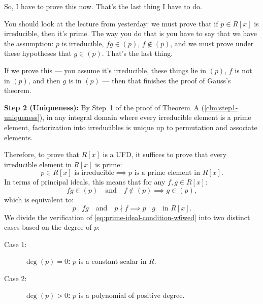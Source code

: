 \begin{proofWrapper}
\begin{speech}[00:31:28 - 00:33:17]
So, I have to prove this now. That's the last thing I have to do.

You should look at the lecture from yesterday: we must prove that if $p \in R[x]$ is irreducible,  then it's prime. The way you do that is you have to say that we have the assumption: $p$ is irreducible, $fg \in (p)$,  $f \notin (p)$,  and we must prove under these hypotheses that $g \in (p)$.  That's the last thing.

If we prove this --- you assume it's irreducible, these things lie in $(p)$, $f$ is not in $(p)$, and then $g$ is in $(p)$ --- then that finishes the proof of Gauss's theorem.
\end{speech}

\begin{content}
\textbf{Step 2 (Uniqueness):}
By Step~1 of the proof of Theorem~A (\cref{clm:step1-uniqueness}), in any integral domain where every irreducible element is a prime element, factorization into irreducibles is unique up to permutation and associate elements.

Therefore, to prove that $R[x]$ is a UFD, it suffices to prove that every irreducible element in $R[x]$ is prime:
\begin{equation}\label{eq:irred-implies-prime-goal}
p \in R[x] \text{ is irreducible} \implies p \text{ is a prime element in } R[x].
\end{equation}
In terms of principal ideals, this means that for any $f, g \in R[x]$:
\begin{equation}\label{eq:prime-ideal-condition-w6wed}
fg \in (p) \quad \text{and} \quad f \notin (p) \implies g \in (p),
\end{equation}
which is equivalent to:
\[
p \mid fg \quad \text{and} \quad p \nmid f \implies p \mid g \quad \text{in } R[x].
\]
We divide the verification of \eqref{eq:prime-ideal-condition-w6wed} into two distinct cases based on the degree of $p$:
\begin{description}
    \item[Case 1:] \textbf{$\deg(p) = 0$:} $p$ is a constant scalar in $R$.
    \item[Case 2:] \textbf{$\deg(p) > 0$:} $p$ is a polynomial of positive degree.
\end{description}
\end{content}


\end{proofWrapper}
